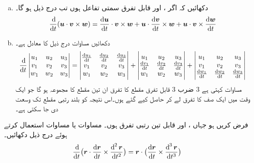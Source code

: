 \begin{enumerate}[a.]
\item
دکھائیں کہ اگر ،  اور  قابل تفرق سمتی تفاعل ہوں تب درج ذیل ہو گا۔
\begin{align}\label{مساوات_سمتی_تفاعل_سہ_ضرب_تفرق_الف}
\frac{\dif}{\dif t}(\kvec{u}\cdot\kvec{v}\times\kvec{w})=\frac{\dif \kvec{u}}{\dif t}\cdot\kvec{v}\times\kvec{w}+\kvec{u}\cdot\frac{\dif \kvec{v}}{\dif t}\times\kvec{w}+\kvec{u}\cdot\kvec{v}\times\frac{\dif \kvec{w}}{\dif t}
\end{align}
\item
دکھائیں مساوات  درج ذیل کا معادل ہے۔
\begin{align}\label{مساوات_سمتی_تفاعل_سہ_ضرب_تفرق_ب}
\frac{\dif}{\dif t}\begin{vmatrix}u_1&u_2&u_3\\v_1&v_2&v_3\\w_1&w_2&w_3  \end{vmatrix}=
\begin{vmatrix}
\frac{\dif u_1}{\dif t}&\frac{\dif u_2}{\dif t}&\frac{\dif u_3}{\dif t}\\v_1&v_2&v_3\\w_1&w_2&w_3
\end{vmatrix}+
\begin{vmatrix}
u_1&u_2&u_3\\
\frac{\dif v_1}{\dif t}&\frac{\dif v_2}{\dif t}&\frac{\dif v_3}{\dif t}\\w_1&w_2&w_3
\end{vmatrix}+
\begin{vmatrix}
u_1&u_2&u_3\\
v_1&v_2&v_3\\
\frac{\dif w_1}{\dif t}&\frac{\dif w_2}{\dif t}&\frac{\dif w_3}{\dif t}
\end{vmatrix}
\end{align}
مساوات  کہتی ہے  3 ضرب 3 قابل تفرق مقطع کا تفرق ان تین مقطع کا مجموعہ ہو گا جو ایک وقت میں  ایک  صف کا تفرق لے کر حاصل کیے گئے ہوں۔اس نتیجہ  کو بلند رتبی  مقطع تک وسعت دی جا سکتی ہے۔ 
\end{enumerate}
فرض کریں  ہو جہاں ،  اور  قابل تین رتبی تفرق ہوں۔ مساوات  یا مساوات  استعمال کرتے ہوئے  درج ذیل دکھائیں۔
\begin{align}\label{مساوات_سمتی_تفاعل_سہ_ضرب_تفرق_پ}
\frac{\dif}{\dif t}\big(\kvec{r}\cdot\frac{\dif \kvec{r}}{\dif t}\times \frac{\dif^{\,2}\kvec{r}}{\dif t^2}\big)=\kvec{r}\cdot\big(\frac{\dif \kvec{r}}{\dif t}\times \frac{\dif^{\,3}\kvec{r}}{\dif t^3}\big)
\end{align}
